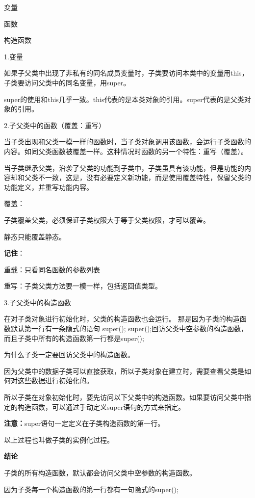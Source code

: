 \documentclass[UTF8]{ctexart}
\begin{document}
\textbullet 变量

\textbullet 函数

\textbullet 构造函数

1.变量

如果子父类中出现了非私有的同名成员变量时，子类要访问本类中的变量用this，
子类要访问父类中的同名变量，用super。

\textbullet super的使用和this几乎一致。this代表的是本类对象的引用。super代表的是父类对象的引用。

2.子父类中的函数（覆盖：重写）

当子类出现和父类一模一样的函数时，当子类对象调用该函数，会运行子类函数的内容。如同父类函数被覆盖一样。这种情况时函数的另一个特性：重写（覆盖）。

当子类继承父类，沿袭了父类的功能到子类中，子类虽具有该功能，但是功能的内容却和父类不一致，这是，没有必要定义新功能，而是使用覆盖特性，保留父类的功能定义，并重写功能内容。

覆盖：

\textbullet 子类覆盖父类，必须保证子类权限大于等于父类权限，才可以覆盖。

\textbullet 静态只能覆盖静态。

\textbf{记住}：

重载：只看同名函数的参数列表

重写：子类父类方法要一模一样，包括返回值类型。


3.子父类中的构造函数

在对子类对象进行初始化时，父类的构造函数也会运行。
那是因为子类的构造函数默认第一行有一条隐式的语句 super();
super();回访父类中空参数的构造函数，而且子类中所有的构造函数第一行都是super();

为什么子类一定要回访父类中的构造函数。

因为父类中的数据子类可以直接获取，所以子类对象在建立时，需要查看父类是如何对这些数据进行初始化的。

所以子类在对象初始化时，要先访问以下父类中的构造函数。如果要访问父类中指定的构造函数，可以通过手动定义super语句的方式来指定。

\textbf{注意：}super语句一定定义在子类构造函数的第一行。

以上过程也叫做子类的实例化过程。

\textbf{结论}

\textbullet 子类的所有构造函数，默认都会访问父类中空参数的构造函数。

\textbullet 因为子类每一个构造函数的第一行都有一句隐式的super();
\end{document}
